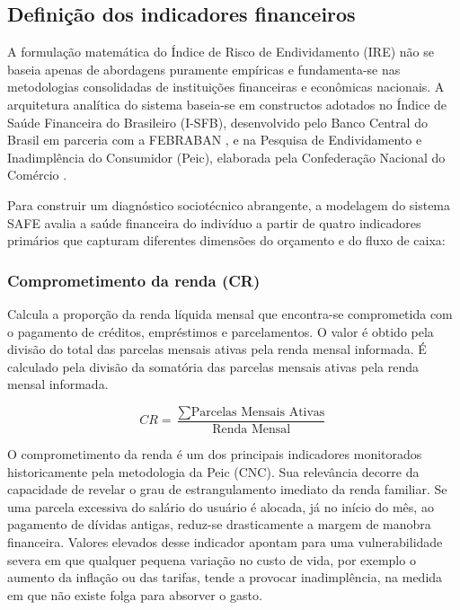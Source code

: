 \documentclass[portuguese]{sbc2025}%
\begin{document}
\subsection{Definição dos indicadores financeiros}
A formulação matemática do Índice de Risco de Endividamento (IRE) não se baseia apenas de abordagens puramente empíricas e fundamenta-se nas metodologias consolidadas de instituições financeiras e econômicas nacionais. A arquitetura analítica do sistema baseia-se em constructos adotados no Índice de Saúde Financeira do Brasileiro (I-SFB), desenvolvido pelo Banco Central do Brasil em parceria com a FEBRABAN \citep{febraban2021}, e na Pesquisa de Endividamento e Inadimplência do Consumidor (Peic), elaborada pela Confederação Nacional do Comércio \citep{peic2026}.

Para construir um diagnóstico sociotécnico abrangente, a modelagem do sistema SAFE avalia a saúde financeira do indivíduo a partir de quatro indicadores primários que capturam diferentes dimensões do orçamento e do fluxo de caixa:

\subsubsection{Comprometimento da renda (CR)}

Calcula a proporção da renda líquida mensal que encontra-se comprometida com o pagamento de créditos, empréstimos e parcelamentos. O valor é obtido pela divisão do total das parcelas mensais ativas pela renda mensal informada. É calculado pela divisão da somatória das parcelas mensais ativas pela renda mensal informada.

\begin{equation}\label{equ1}
    CR = \frac{\sum \text{Parcelas Mensais Ativas}}{\text{Renda Mensal}}
\end{equation}

O comprometimento da renda é um dos principais indicadores monitorados historicamente pela metodologia da Peic (CNC). Sua relevância decorre da capacidade de revelar o grau de estrangulamento imediato da renda familiar. Se uma parcela excessiva do salário do usuário é alocada, já no início do mês, ao pagamento de dívidas antigas, reduz-se drasticamente a margem de manobra financeira. Valores elevados desse indicador apontam para uma vulnerabilidade severa em que qualquer pequena variação no custo de vida, por exemplo o aumento da inflação ou das tarifas, tende a provocar inadimplência, na medida em que não existe folga para absorver o gasto.
\end{document}
